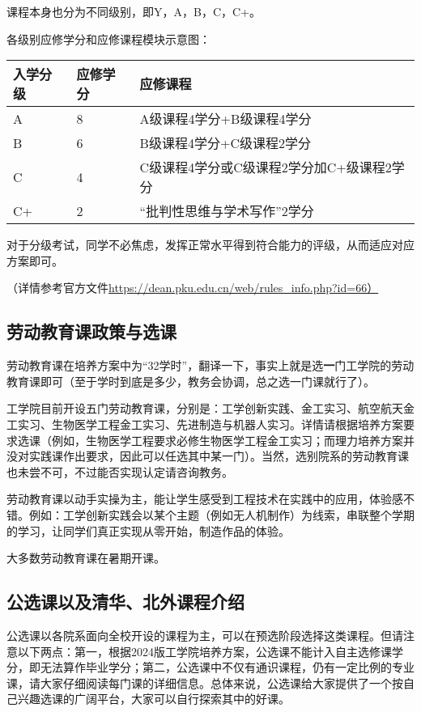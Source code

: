 \documentclass[11pt,oneside]{book}
\begin{document}
课程本身也分为不同级别，即Y，A，B，C，C+。 

各级别应修学分和应修课程模块示意图：

\begin{table}[htbp]
\centering

\begin{tabular}{| l | l | l |}
\hline
入学分级 & 应修学分 & 应修课程 \\
\hline
A & 8 & A级课程4学分+B级课程4学分 \\
\hline
B & 6 & B级课程4学分+C级课程2学分 \\
\hline
C & 4 & C级课程4学分或C级课程2学分加C+级课程2学分 \\
\hline
C+  & 2 & “批判性思维与学术写作”2学分 \\
\hline

\end{tabular}

\end{table}

对于分级考试，同学不必焦虑，发挥正常水平得到符合能力的评级，从而适应对应方案即可。

（详情参考官方文件\href{https://dean.pku.edu.cn/web/rules_info.php?id=66\%EF\%BC\%89}{https://dean.pku.edu.cn/web/rules\_info.php?id=66）}

        \subsection{劳动教育课政策与选课}
    劳动教育课在培养方案中为“32学时”，翻译一下，事实上就是选\textbf{\textbf{一}}门工学院的劳动教育课即可（至于学时到底是多少，教务会协调，总之选一门课就行了）。

工学院目前开设五门劳动教育课，分别是：工学创新实践、金工实习、航空航天金工实习、生物医学工程金工实习、先进制造与机器人实习。详情请根据培养方案要求选课（例如，生物医学工程要求必修生物医学工程金工实习；而理力培养方案并没对实践课作出要求，因此可以任选其中某一门）。当然，选别院系的劳动教育课也未尝不可，不过能否实现认定请咨询教务。

劳动教育课以动手实操为主，能让学生感受到工程技术在实践中的应用，体验感不错。例如：工学创新实践会以某个主题（例如无人机制作）为线索，串联整个学期的学习，让同学们真正实现从零开始，制造作品的体验。

大多数劳动教育课在暑期开课。

        \subsection{公选课以及清华、北外课程介绍}
公选课以各院系面向全校开设的课程为主，可以在预选阶段选择这类课程。但请注意以下两点：第一，根据2024版工学院培养方案，公选课不能计入自主选修课学分，即无法算作毕业学分；第二，公选课中不仅有通识课程，仍有一定比例的专业课，请大家仔细阅读每门课的详细信息。总体来说，公选课给大家提供了一个按自己兴趣选课的广阔平台，大家可以自行探索其中的好课。
\end{document}
